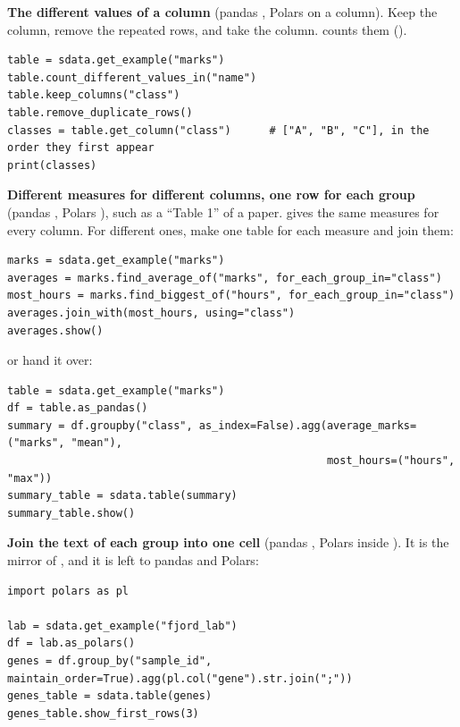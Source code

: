 \textbf{The different values of a column} (pandas , Polars  on a column).
Keep the column, remove the repeated rows, and take the column. 
counts them ().

\begin{lstlisting}[style=py]
table = sdata.get_example("marks")
table.count_different_values_in("name")
table.keep_columns("class")
table.remove_duplicate_rows()
classes = table.get_column("class")      # ["A", "B", "C"], in the order they first appear
print(classes)
\end{lstlisting}

\textbf{Different measures for different columns, one row for each group} (pandas
, Polars ),
such as a ``Table 1'' of a paper.  gives the same measures for every column.
For different ones, make one table for each measure and join them:

\begin{lstlisting}[style=py]
marks = sdata.get_example("marks")
averages = marks.find_average_of("marks", for_each_group_in="class")
most_hours = marks.find_biggest_of("hours", for_each_group_in="class")
averages.join_with(most_hours, using="class")
averages.show()
\end{lstlisting}

or hand it over:

\begin{lstlisting}[style=py]
table = sdata.get_example("marks")
df = table.as_pandas()
summary = df.groupby("class", as_index=False).agg(average_marks=("marks", "mean"),
                                                  most_hours=("hours", "max"))
summary_table = sdata.table(summary)
summary_table.show()
\end{lstlisting}

\textbf{Join the text of each group into one cell} (pandas , Polars
 inside ). It is the mirror of , and it is left to
pandas and Polars:

\begin{lstlisting}[style=py]
import polars as pl

lab = sdata.get_example("fjord_lab")
df = lab.as_polars()
genes = df.group_by("sample_id", maintain_order=True).agg(pl.col("gene").str.join(";"))
genes_table = sdata.table(genes)
genes_table.show_first_rows(3)
\end{lstlisting}

